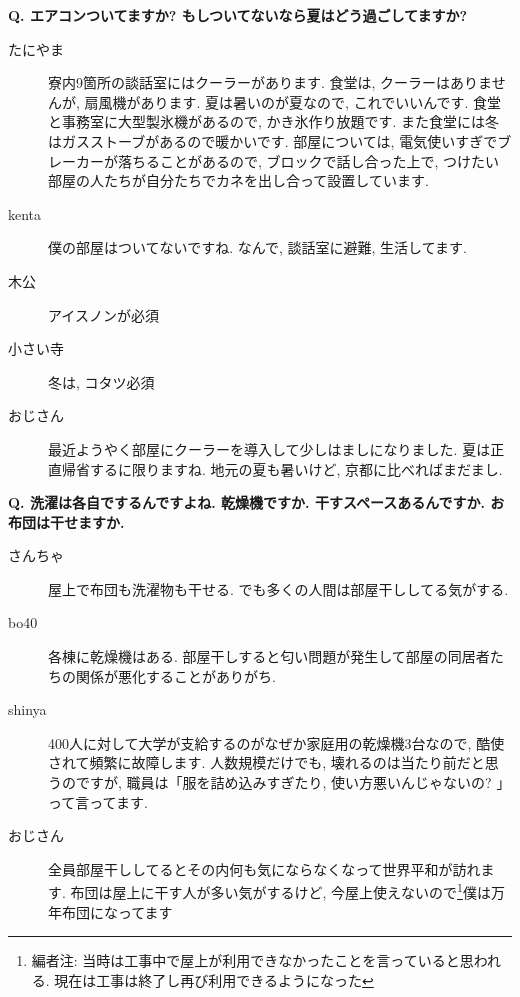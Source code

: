 \documentclass[10pt,b5jsbook,dvips,dvipdfmx,openany]{jsbook}
\theoremstyle{definition}
\begin{document}
		\begin{multicols}{2}
		\begin{tcolorbox}
		\textbf{Q. エアコンついてますか? もしついてないなら夏はどう過ごしてますか?}
		\end{tcolorbox}
		\begin{description}
		\item[たにやま]
		寮内9箇所の談話室にはクーラーがあります. 食堂は, クーラーはありませんが, 扇風機があります. 夏は暑いのが夏なので, これでいいんです. 食堂と事務室に大型製氷機があるので, かき氷作り放題です. また食堂には冬はガスストーブがあるので暖かいです. 部屋については, 電気使いすぎでブレーカーが落ちることがあるので, ブロックで話し合った上で, つけたい部屋の人たちが自分たちでカネを出し合って設置しています. 
		\item[kenta]
		僕の部屋はついてないですね. なんで, 談話室に避難, 生活してます. 
		\item[木公]
		アイスノンが必須
		\item[小さい寺]
		冬は, コタツ必須
		\item[おじさん]
		最近ようやく部屋にクーラーを導入して少しはましになりました. 夏は正直帰省するに限りますね. 地元の夏も暑いけど, 京都に比べればまだまし. 
		\end{description}

		\begin{tcolorbox}
		\textbf{Q. 洗濯は各自でするんですよね. 乾燥機ですか. 干すスペースあるんですか. お布団は干せますか. }
		\end{tcolorbox}
		\begin{description}
		\item[さんちゃ]屋上で布団も洗濯物も干せる. でも多くの人間は部屋干ししてる気がする. 
		\item[bo40]各棟に乾燥機はある. 部屋干しすると匂い問題が発生して部屋の同居者たちの関係が悪化することがありがち. 
		\item[shinya]
		400人に対して大学が支給するのがなぜか家庭用の乾燥機3台なので, 酷使されて頻繁に故障します. 人数規模だけでも, 壊れるのは当たり前だと思うのですが, 職員は「服を詰め込みすぎたり, 使い方悪いんじゃないの? 」って言ってます. 
		\item[おじさん]
		全員部屋干ししてるとその内何も気にならなくなって世界平和が訪れます. 布団は屋上に干す人が多い気がするけど, 今屋上使えないので\footnote{編者注: 当時は工事中で屋上が利用できなかったことを言っていると思われる. 現在は工事は終了し再び利用できるようになった}僕は万年布団になってます
		\end{description}



\end{multicols}
\end{document}
